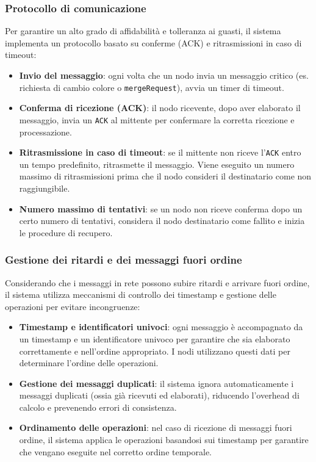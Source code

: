 \documentclass[12pt, a4paper]{report}
\begin{document}
\newpage
\subsubsection{Protocollo di comunicazione}
\label{sec:ack}
Per garantire un alto grado di affidabilit\`a e tolleranza ai guasti, il sistema implementa un protocollo basato su conferme (ACK) e ritrasmissioni in caso di timeout:

\begin{itemize}
    \item \textbf{Invio del messaggio}: ogni volta che un nodo invia un messaggio critico (es. richiesta di cambio colore o \texttt{mergeRequest}), avvia un timer di timeout.
    \item \textbf{Conferma di ricezione (ACK)}: il nodo ricevente, dopo aver elaborato il messaggio, invia un \texttt{ACK} al mittente per confermare la corretta ricezione e processazione.
    \item \textbf{Ritrasmissione in caso di timeout}: se il mittente non riceve l'\texttt{ACK} entro un tempo predefinito, ritrasmette il messaggio. Viene eseguito un numero massimo di ritrasmissioni prima che il nodo consideri il destinatario come non raggiungibile.
    \item \textbf{Numero massimo di tentativi}: se un nodo non riceve conferma dopo un certo numero di tentativi, considera il nodo destinatario come fallito e inizia le procedure di recupero.
\end{itemize}

\subsubsection{Gestione dei ritardi e dei messaggi fuori ordine}

Considerando che i messaggi in rete possono subire ritardi e arrivare fuori ordine, il sistema utilizza meccanismi di controllo dei timestamp e gestione delle operazioni per evitare incongruenze:

\begin{itemize}
    \item \textbf{Timestamp e identificatori univoci}: ogni messaggio \`e accompagnato da un timestamp e un identificatore univoco per garantire che sia elaborato correttamente e nell'ordine appropriato. I nodi utilizzano questi dati per determinare l'ordine delle operazioni.
    \item \textbf{Gestione dei messaggi duplicati}: il sistema ignora automaticamente i messaggi duplicati (ossia gi\`a ricevuti ed elaborati), riducendo l'overhead di calcolo e prevenendo errori di consistenza.
    \item \textbf{Ordinamento delle operazioni}: nel caso di ricezione di messaggi fuori ordine, il sistema applica le operazioni basandosi sui timestamp per garantire che vengano eseguite nel corretto ordine temporale.
\end{itemize}
\newpage
\end{document}
